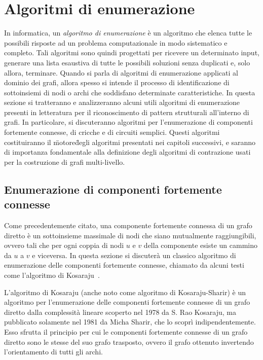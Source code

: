 \section{Algoritmi di enumerazione}\label{sec:algoritmi-di-enumerazione}

In informatica, un \textit{algoritmo di enumerazione} \`e un algoritmo che elenca tutte le possibili risposte ad un
problema computazionale in modo sistematico e completo. Tali algoritmi sono quindi progettati per ricevere un
determinato input, generare una lista esaustiva di tutte le possibili soluzioni senza duplicati e, solo allora,
terminare.
Quando si parla di algoritmi di enumerazione applicati al dominio dei grafi, allora spesso si intende il processo di
identificazione di sottoinsiemi di nodi o archi che soddisfano determinate caratteristiche.
In questa sezione si tratteranno e analizzeranno alcuni utili algoritmi di enumerazione presenti in letteratura per
il riconoscimento di pattern strutturali all'interno di grafi.
In particolare, si discuteranno algoritmi per l'enumerazione di componenti fortemente connesse, di cricche e di
circuiti semplici.
Questi algoritmi costituiranno il \"motore\" degli algoritmi presentati nei capitoli successivi, e saranno di
importanza fondamentale alla definizione degli algoritmi di contrazione usati per la costruzione di grafi multi-livello.

\subsection{Enumerazione di componenti fortemente connesse}\label{subsec:enumerazione-di-componenti-fortemente-connesse}

Come precedentemente citato, una componente fortemente connessa di un grafo diretto \`e un sottoinsieme massimale
di nodi che siano mutualmente raggiungibili, ovvero tali che per ogni coppia di nodi $u$ e $v$ della componente esiste
un cammino da $u$ a $v$ e viceversa.
In questa sezione si discuter\`a un classico algoritmo di enumerazione delle componenti fortemente connesse, chiamato
da alcuni testi come l'algoritmo di Kosaraju~\cite{SHARIR198167}.


L'algoritmo di Kosaraju (anche noto come algoritmo di Kosaraju-Sharir) è un algoritmo per l'enumerazione
delle componenti fortemente connesse di un grafo diretto dalla complessità lineare scoperto nel 1978 da S. Rao
Kosaraju, ma pubblicato solamente nel 1981 da Micha Sharir, che lo scoprì indipendentemente.
Esso sfrutta il principio per cui le componenti fortemente connesse di un grafo diretto sono le stesse del suo grafo
trasposto, ovvero il grafo ottenuto invertendo l'orientamento di tutti gli archi. \newline

